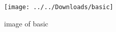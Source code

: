 \documentclass{article}
\begin{document}
\begin{figure}
	\centering
	\texttt{[image: ../../Downloads/basic]}
	\caption{image of basic}
	\label{fig:basic}
\end{figure}
\end{document}

